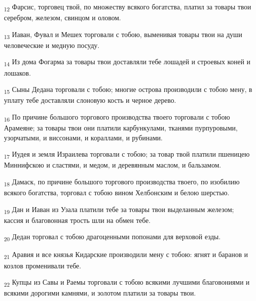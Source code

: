 \begin{tcolorbox}
\textsubscript{12} Фарсис, торговец твой, по множеству всякого богатства, платил за товары твои серебром, железом, свинцом и оловом.
\end{tcolorbox}
\begin{tcolorbox}
\textsubscript{13} Иаван, Фувал и Мешех торговали с тобою, выменивая товары твои на души человеческие и медную посуду.
\end{tcolorbox}
\begin{tcolorbox}
\textsubscript{14} Из дома Фогарма за товары твои доставляли тебе лошадей и строевых коней и лошаков.
\end{tcolorbox}
\begin{tcolorbox}
\textsubscript{15} Сыны Дедана торговали с тобою; многие острова производили с тобою мену, в уплату тебе доставляли слоновую кость и черное дерево.
\end{tcolorbox}
\begin{tcolorbox}
\textsubscript{16} По причине большого торгового производства твоего торговали с тобою Арамеяне; за товары твои они платили карбункулами, тканями пурпуровыми, узорчатыми, и виссонами, и кораллами, и рубинами.
\end{tcolorbox}
\begin{tcolorbox}
\textsubscript{17} Иудея и земля Израилева торговали с тобою; за товар твой платили пшеницею Миннифскою и сластями, и медом, и деревянным маслом, и бальзамом.
\end{tcolorbox}
\begin{tcolorbox}
\textsubscript{18} Дамаск, по причине большого торгового производства твоего, по изобилию всякого богатства, торговал с тобою вином Хелбонским и белою шерстью.
\end{tcolorbox}
\begin{tcolorbox}
\textsubscript{19} Дан и Иаван из Узала платили тебе за товары твои выделанным железом; кассия и благовонная трость шли на обмен тебе.
\end{tcolorbox}
\begin{tcolorbox}
\textsubscript{20} Дедан торговал с тобою драгоценными попонами для верховой езды.
\end{tcolorbox}
\begin{tcolorbox}
\textsubscript{21} Аравия и все князья Кидарские производили мену с тобою: ягнят и баранов и козлов променивали тебе.
\end{tcolorbox}
\begin{tcolorbox}
\textsubscript{22} Купцы из Савы и Раемы торговали с тобою всякими лучшими благовониями и всякими дорогими камнями, и золотом платили за товары твои.
\end{tcolorbox}
